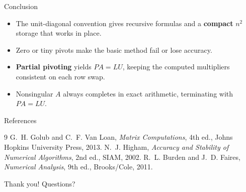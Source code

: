 \documentclass[11pt,aspectratio=169]{beamer}
\begin{document}
\begin{frame}{Conclusion}
  \begin{itemize}
    \item The unit-diagonal convention gives recursive formulas and a \textbf{compact}
      $n^2$ storage that works in place.
    \item Zero or tiny pivots make the basic method fail or lose accuracy.
    \item \textbf{Partial pivoting} yields $PA=LU$, keeping the computed multipliers
      consistent on each row swap.
    \item Nonsingular $A$ always completes in exact arithmetic, terminating with
      $PA=LU$.
  \end{itemize}
\end{frame}

\begin{frame}{References}
  \begin{thebibliography}{9}
     G.~H. Golub and C.~F. Van Loan,
      \emph{Matrix Computations}, 4th ed., Johns Hopkins University Press, 2013.
     N.~J. Higham,
      \emph{Accuracy and Stability of Numerical Algorithms}, 2nd ed., SIAM, 2002.
     R.~L. Burden and J.~D. Faires,
      \emph{Numerical Analysis}, 9th ed., Brooks/Cole, 2011.
  \end{thebibliography}
  \vfill
  \centering \Large Thank you! \; Questions?
\end{frame}
\end{document}
